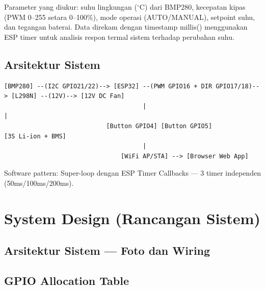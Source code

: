 \documentclass[11pt,a4paper]{article}
\begin{document}
Parameter yang diukur: suhu lingkungan ($^{\circ}$C) dari BMP280, kecepatan kipas (PWM 0--255 setara 0--100\%), mode operasi (AUTO/MANUAL), setpoint suhu, dan tegangan baterai. Data direkam dengan timestamp millis() menggunakan ESP timer untuk analisis respon termal sistem terhadap perubahan suhu.

\subsection{Arsitektur Sistem}

\begin{verbatim}
[BMP280] --(I2C GPIO21/22)--> [ESP32] --(PWM GPIO16 + DIR GPIO17/18)--> [L298N] --(12V)--> [12V DC Fan]
                                      |                                               |
                            [Button GPIO4] [Button GPIO5]                   [3S Li-ion + BMS]
                                      |
                                [WiFi AP/STA] --> [Browser Web App]
\end{verbatim}

Software pattern: Super-loop dengan ESP Timer Callbacks --- 3 timer independen (50ms/100ms/200ms).

\section{System Design (Rancangan Sistem)}

\subsection{Arsitektur Sistem --- Foto dan Wiring}

\begin{center}
\end{center}

\begin{center}
\end{center}

\subsection{GPIO Allocation Table}
\end{document}
